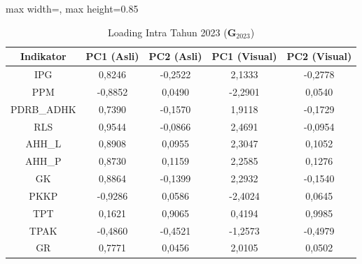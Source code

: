 \begin{table}[H]
\centering
\caption{Loading Intra Tahun 2023 ($\mathbf{G}_{2023}$)} \label{tab:app1loading_intra_2023}
\begin{adjustbox}{max width=\textwidth, max height=0.85\textheight}
\begin{tabular}{|c|c|c|c|c|}
\hline
\textbf{Indikator} & \textbf{PC1 (Asli)} & \textbf{PC2 (Asli)} & \textbf{PC1 (Visual)} & \textbf{PC2 (Visual)} \\
\hline
IPG & 0,8246 & -0,2522 & 2,1333 & -0,2778 \\
PPM & -0,8852 & 0,0490 & -2,2901 & 0,0540 \\
PDRB\_ADHK & 0,7390 & -0,1570 & 1,9118 & -0,1729 \\
RLS & 0,9544 & -0,0866 & 2,4691 & -0,0954 \\
AHH\_L & 0,8908 & 0,0955 & 2,3047 & 0,1052 \\
AHH\_P & 0,8730 & 0,1159 & 2,2585 & 0,1276 \\
GK & 0,8864 & -0,1399 & 2,2932 & -0,1540 \\
PKKP & -0,9286 & 0,0586 & -2,4024 & 0,0645 \\
TPT & 0,1621 & 0,9065 & 0,4194 & 0,9985 \\
TPAK & -0,4860 & -0,4521 & -1,2573 & -0,4979 \\
GR & 0,7771 & 0,0456 & 2,0105 & 0,0502 \\
\hline
\end{tabular}
\end{adjustbox}
\end{table}